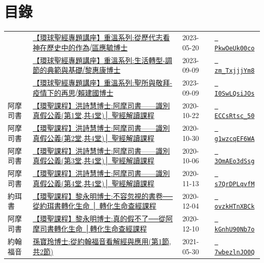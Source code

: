 \documentclass{book}
\begin{document}
\section{目錄}
\label{sec:index}
{ \scriptsize


\begin{xltabular}{\textwidth}{|p{0.15\textwidth} p{0.6\textwidth}|p{0.07\textwidth} p{0.1\textwidth}|}
\hline
    & \hyperref[sec:PkwOeUk00co]{【環球聖經專題講座】重溫系列:從歷代志看神在歷史中的作為⧸區應毓博士} & 2023-05-20 & \href{https://youtube.com/watch?v=PkwOeUk00co}{\texttt{ PkwOeUk00co}} \\
    & \hyperref[sec:zm_TxjjjYm8]{【環球聖經專題講座】重溫系列:生活轉型-調節的典範與基礎⧸黎惠康博士} & 2023-09-09 & \href{https://youtube.com/watch?v=zm_TxjjjYm8}{\texttt{ zm\_TxjjjYm8}} \\
    & \hyperref[sec:I0SwLQsiJOs]{【環球聖經專題講座】重溫系列:聖所與敬拜-疫情下的再思⧸賴建國博士} & 2023-09-09 & \href{https://youtube.com/watch?v=I0SwLQsiJOs}{\texttt{ I0SwLQsiJOs}} \\
阿摩司書   & \hyperref[sec:ECCsRtsc_50]{【環聖課程】洪詩慧博士:阿摩司書——識別真假公義(第1堂,共4堂)│ 聖經解讀課程} & 2020-10-22 & \href{https://youtube.com/watch?v=ECCsRtsc_50}{\texttt{ ECCsRtsc\_50}} \\
阿摩司書   & \hyperref[sec:g1wzcqEF6WA]{【環聖課程】洪詩慧博士:阿摩司書——識別真假公義(第2堂,共4堂)│ 聖經解讀課程} & 2020-10-30 & \href{https://youtube.com/watch?v=g1wzcqEF6WA}{\texttt{ g1wzcqEF6WA}} \\
阿摩司書   & \hyperref[sec:3OmAEo3dSsg]{【環聖課程】洪詩慧博士:阿摩司書——識別真假公義(第3堂,共4堂)│ 聖經解讀課程} & 2020-10-06 & \href{https://youtube.com/watch?v=3OmAEo3dSsg}{\texttt{ 3OmAEo3dSsg}} \\
阿摩司書   & \hyperref[sec:s7QrDPLqvfM]{【環聖課程】洪詩慧博士:阿摩司書——識別真假公義(第4堂,共4堂)│ 聖經解讀課程} & 2020-11-13 & \href{https://youtube.com/watch?v=s7QrDPLqvfM}{\texttt{ s7QrDPLqvfM}} \\
約珥書   & \hyperref[sec:ovzkHTnXBCk]{【環聖課程】黎永明博士:不容忽視的書卷──從約珥書轉化生命 │ 轉化生命查經課程} & 2020-12-04 & \href{https://youtube.com/watch?v=ovzkHTnXBCk}{\texttt{ ovzkHTnXBCk}} \\
阿摩司書   & \hyperref[sec:kGnhU90Nb7o]{【環聖課程】黎永明博士:真的假不了──從阿摩司書轉化生命 │轉化生命查經課程} & 2020-12-10 & \href{https://youtube.com/watch?v=kGnhU90Nb7o}{\texttt{ kGnhU90Nb7o}} \\
約翰福音   & \hyperref[sec:7wbezlnJO0Q]{孫寶玲博士:從約翰福音看解經與應用(第1節,共2節)} & 2021-05-30 & \href{https://youtube.com/watch?v=7wbezlnJO0Q}{\texttt{ 7wbezlnJO0Q}} \\

\end{xltabular}}
\end{document}
